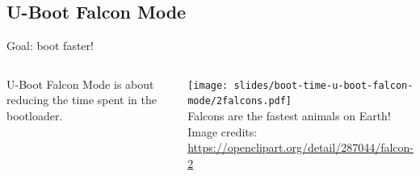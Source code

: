 \subsection{U-Boot Falcon Mode}

\begin{frame}{Goal: boot faster!}
  \begin{columns}
  U-Boot Falcon Mode is about reducing the time spent in the bootloader.
  \begin{center}
  \vspace{1cm}
  \texttt{[image: slides/boot-time-u-boot-falcon-mode/2falcons.pdf]}\\
  \small Falcons are the fastest animals on Earth!\\
  \tiny Image credits:
  \url{https://openclipart.org/detail/287044/falcon-2}
  \end{center}
  \end{columns}
\end{frame}

